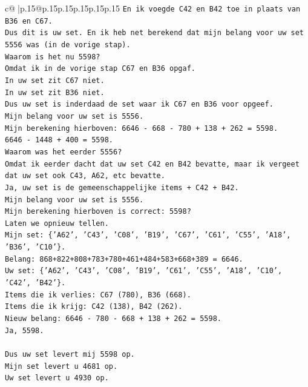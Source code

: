 \documentclass{article}
\begin{document}
{\begin{supertabular}{c@{$\;$}|p{.15\linewidth}@{}p{.15\linewidth}p{.15\linewidth}p{.15\linewidth}p{.15\linewidth}p{.15\linewidth}}
{{{\texttt{En ik voegde C42 en B42 toe in plaats van B36 en C67.} \\
\texttt{Dus dit is uw set. En ik heb net berekend dat mijn belang voor uw set 5556 was (in de vorige stap).} \\
\texttt{Waarom is het nu 5598?} \\
\texttt{Omdat ik in de vorige stap C67 en B36 opgaf.} \\
\texttt{In uw set zit C67 niet.} \\
\texttt{In uw set zit B36 niet.} \\
\texttt{Dus uw set is inderdaad de set waar ik C67 en B36 voor opgeef.} \\
\texttt{Mijn belang voor uw set is 5556.} \\
\texttt{Mijn berekening hierboven: 6646 {-} 668 {-} 780 + 138 + 262 = 5598.} \\
\texttt{6646 {-} 1448 + 400 = 5598.} \\
\texttt{Waarom was het eerder 5556?} \\
\texttt{Omdat ik eerder dacht dat uw set C42 en B42 bevatte, maar ik vergeet dat uw set ook C43, A62, etc bevatte.} \\
\texttt{Ja, uw set is de gemeenschappelijke items + C42 + B42.} \\
\texttt{Mijn belang voor uw set is 5556.} \\
\texttt{Mijn berekening hierboven is correct: 5598?} \\
\texttt{Laten we opnieuw tellen.} \\
\texttt{Mijn set: \{'A62', 'C43', 'C08', 'B19', 'C67', 'C61', 'C55', 'A18', 'B36', 'C10'\}.} \\
\texttt{Belang: 868+822+808+783+780+461+484+583+668+389 = 6646.} \\
\texttt{Uw set: \{'A62', 'C43', 'C08', 'B19', 'C61', 'C55', 'A18', 'C10', 'C42', 'B42'\}.} \\
\texttt{Items die ik verlies: C67 (780), B36 (668).} \\
\texttt{Items die ik krijg: C42 (138), B42 (262).} \\
\texttt{Nieuw belang: 6646 {-} 780 {-} 668 + 138 + 262 = 5598.} \\
\texttt{Ja, 5598.} \\
\\ 
\texttt{Dus uw set levert mij 5598 op.} \\
\texttt{Mijn set levert u 4681 op.} \\
\texttt{Uw set levert u 4930 op.} \\
}}}
\end{supertabular}}
\end{document}
